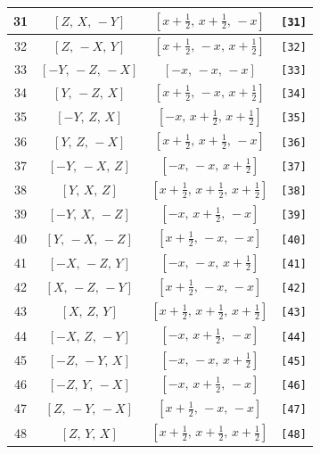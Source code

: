 \documentclass[fleqn,8pt]{jsarticle}
\begin{document}
\begin{longtable}{cccc}
31 & $\left[ Z,\, X,\, - Y \right]$ & $\left[ x + \frac{1}{2},\, x + \frac{1}{2},\, - x \right]$ & {\tt [31]} \\ \hline
32 & $\left[ Z,\, - X,\, Y \right]$ & $\left[ x + \frac{1}{2},\, - x,\, x + \frac{1}{2} \right]$ & {\tt [32]} \\ \hline
33 & $\left[ - Y,\, - Z,\, - X \right]$ & $\left[ - x,\, - x,\, - x \right]$ & {\tt [33]} \\ \hline
34 & $\left[ Y,\, - Z,\, X \right]$ & $\left[ x + \frac{1}{2},\, - x,\, x + \frac{1}{2} \right]$ & {\tt [34]} \\ \hline
35 & $\left[ - Y,\, Z,\, X \right]$ & $\left[ - x,\, x + \frac{1}{2},\, x + \frac{1}{2} \right]$ & {\tt [35]} \\ \hline
36 & $\left[ Y,\, Z,\, - X \right]$ & $\left[ x + \frac{1}{2},\, x + \frac{1}{2},\, - x \right]$ & {\tt [36]} \\ \hline
37 & $\left[ - Y,\, - X,\, Z \right]$ & $\left[ - x,\, - x,\, x + \frac{1}{2} \right]$ & {\tt [37]} \\ \hline
38 & $\left[ Y,\, X,\, Z \right]$ & $\left[ x + \frac{1}{2},\, x + \frac{1}{2},\, x + \frac{1}{2} \right]$ & {\tt [38]} \\ \hline
39 & $\left[ - Y,\, X,\, - Z \right]$ & $\left[ - x,\, x + \frac{1}{2},\, - x \right]$ & {\tt [39]} \\ \hline
40 & $\left[ Y,\, - X,\, - Z \right]$ & $\left[ x + \frac{1}{2},\, - x,\, - x \right]$ & {\tt [40]} \\ \hline
41 & $\left[ - X,\, - Z,\, Y \right]$ & $\left[ - x,\, - x,\, x + \frac{1}{2} \right]$ & {\tt [41]} \\ \hline
42 & $\left[ X,\, - Z,\, - Y \right]$ & $\left[ x + \frac{1}{2},\, - x,\, - x \right]$ & {\tt [42]} \\ \hline
43 & $\left[ X,\, Z,\, Y \right]$ & $\left[ x + \frac{1}{2},\, x + \frac{1}{2},\, x + \frac{1}{2} \right]$ & {\tt [43]} \\ \hline
44 & $\left[ - X,\, Z,\, - Y \right]$ & $\left[ - x,\, x + \frac{1}{2},\, - x \right]$ & {\tt [44]} \\ \hline
45 & $\left[ - Z,\, - Y,\, X \right]$ & $\left[ - x,\, - x,\, x + \frac{1}{2} \right]$ & {\tt [45]} \\ \hline
46 & $\left[ - Z,\, Y,\, - X \right]$ & $\left[ - x,\, x + \frac{1}{2},\, - x \right]$ & {\tt [46]} \\ \hline
47 & $\left[ Z,\, - Y,\, - X \right]$ & $\left[ x + \frac{1}{2},\, - x,\, - x \right]$ & {\tt [47]} \\ \hline
48 & $\left[ Z,\, Y,\, X \right]$ & $\left[ x + \frac{1}{2},\, x + \frac{1}{2},\, x + \frac{1}{2} \right]$ & {\tt [48]} \\
\end{longtable}
\end{document}
